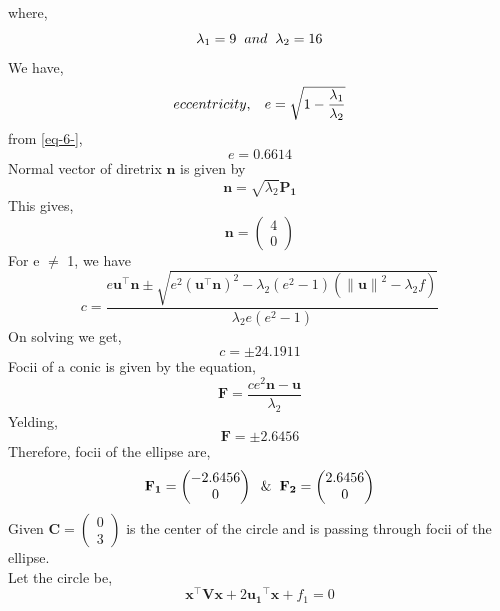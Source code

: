 \documentclass[journal,10pt,twocolumn]{article}
\providecommand{\norm}[1]{\left\lVert#1\right\rVert}
\let\vec\mathbf
\newcommand{\myvec}[1]{\ensuremath{\begin{pmatrix}#1\end{pmatrix}}}
\providecommand{\brak}[1]{\ensuremath{\left(#1\right)}}
\begin{document}
where,
\begin{equation}
\lambda_1 = 9 \hspace{2mm} and \hspace{2mm} \lambda_2 = 16
\label{eq-6-}
\end{equation}
We have,
\begin{equation}
eccentricity, \hspace{3mm} e = \sqrt{1-\frac{\lambda_1}{\lambda_2}}
\label{eq-7-}
\end{equation}
from \eqref{eq-6-},
\begin{equation}
e = 0.6614
\label{eq-8-}
\end{equation}
Normal vector of diretrix $\vec{n}$ is given by
\begin{equation}
\vec{n} = \sqrt{\lambda_2}\vec{P_1}
\label{eq-9-}
\end{equation}
This gives,
\begin{equation}
\vec{n} = \myvec{4 \\ 0}
\label{eq-10-}
\end{equation}
For e $\neq$ 1, we have
\begin{equation}
c = \frac{e\vec{u}^{\top} \vec{n}\pm \sqrt{e^2\brak{\vec{u}^{\top}\vec{n}}^2 - \lambda_2 \brak{e^2-1}\brak{\norm{\vec{u}}^2-\lambda_2 f }}}{\lambda_2 e \brak{e^2-1}}
\label{eq-11-}
\end{equation}
On solving we get,
\begin{equation}
c = \pm 24.1911
\label{eq-12-}
\end{equation}
Focii of a conic is given by the equation,
\begin{equation}
\vec{F} = \frac{ce^2\vec{n}-\vec{u}}{\lambda_2}
\label{eq-13-}
\end{equation}
Yelding,
\begin{equation}
\vec{F} = \pm 2.6456
\label{eq-14-}
\end{equation}
Therefore, focii of the ellipse are,
\begin{equation}
\vec{F_1} = \myvec{-2.6456 \\ 0} \hspace{2mm} \& \hspace{2mm} \vec{F_2} = \myvec{2.6456 \\ 0}
\label{eq-15-}
\end{equation}
Given $\vec{C} = \myvec{0 \\ 3}$ is the center of the circle and is passing through focii of the ellipse.\\
Let the circle be,
\begin{equation}
\vec{x}^{\top}\vec{V}\vec{x}+2\vec{u_1}^{\top}\vec{x}+f_1=0
\label{eq-16-}
\end{equation}
\end{document}
